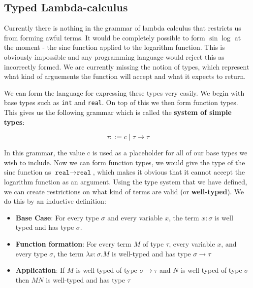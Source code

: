 \documentclass[11pt]{article}
\begin{document}
	\subsection{Typed Lambda-calculus}
	Currently there is nothing in the grammar of lambda calculus that restricts us from forming awful terms. It would be completely possible to form $\sin \log$ at the moment - the sine function applied to the logarithm function. This is obviously impossible and any programming language would reject this as incorrectly formed. We are currently missing the notion of types, which represent what kind of arguements the function will accept and what it expects to return.
	
	\par 
	We can form the language for expressing these types very easily. We begin with base types such as \texttt{int} and \texttt{real}. On top of this we then form function types. This gives us the following grammar which is called the \textbf{system of simple types}:
	
	\[ \tau ::= c \; | \; \tau \rightarrow \tau \]
	
	\par In this grammar, the value c is used as a placeholder for all of our base types we wish to include. Now we can form function types, we would give the type of the sine function as $\texttt{real} \rightarrow \texttt{real}$, which makes it obvious that it cannot accept the logarithm function as an argument. Using the type system that we have defined, we can create restrictions on what kind of terms are valid (or \textbf{well-typed}). We do this by an inductive definition:
	\begin{itemize}
		\item \textbf{Base Case}: For every type $\sigma$ and every variable $x$, the term $x:\sigma$ is well typed and has type $\sigma$.
		\item \textbf{Function formation}: For every term $M$ of type $\tau$, every variable $x$, and every type $\sigma$, the term $\lambda x:\sigma .M$ is well-typed and has type $\sigma \rightarrow \tau$
		\item \textbf{Application}: If $M$ is well-typed of type $\sigma \rightarrow \tau$ and $N$ is well-typed of type $\sigma$ then $M N$ is well-typed and has type $\tau$
	\end{itemize}	
	
	
	\newpage
	\listoffigures
	\printindex
\end{document}
